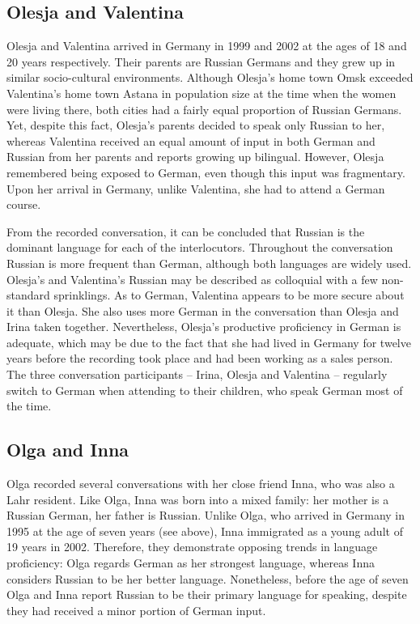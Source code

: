 \subsection{Olesja and Valentina}
Olesja and Valentina arrived in Germany in 1999 and 2002 at the ages of 18 and 20 years respectively. Their parents are Russian Germans and they grew up in similar socio-cultural environments. Although Olesja's home town Omsk exceeded Valentina's home town Astana in population size at the time when the women were living there, both cities had a fairly equal proportion of Russian Germans. Yet, despite this fact, Olesja's parents decided to speak only Russian to her, whereas Valentina received an equal amount of input in both German and Russian from her parents and reports growing up bilingual. However, Olesja remembered being exposed to German, even though this input was fragmentary. Upon her arrival in Germany, unlike Valentina, she had to attend a German course.

From the recorded conversation, it can be concluded that Russian is the dominant language for each of the interlocutors. Throughout the conversation Russian is more frequent than German, although both languages are widely used. Olesja's and Valentina's Russian may be described as colloquial with a few non-standard sprinklings. As to German, Valentina appears to be more secure about it than Olesja. She also uses more German in the conversation than Olesja and Irina taken together. Nevertheless, Olesja's productive proficiency in German is adequate, which may be due to the fact that she had lived in Germany for twelve years before the recording took place and had been working as a sales person. The three conversation participants  --  Irina, Olesja and Valentina  --  regularly switch to German when attending to their children, who speak German most of the time.

\subsection{Olga and Inna}
Olga recorded several conversations with her close friend Inna, who was also a Lahr resident. Like Olga, Inna was born into a mixed family: her mother is a Russian German, her father is Russian. Unlike Olga, who arrived in Germany in 1995 at the age of seven years (see above), Inna immigrated as a young adult of 19 years in 2002. Therefore, they demonstrate opposing trends in language proficiency: Olga regards German as her strongest language, whereas Inna considers  Russian to be her better language. Nonetheless, before the age of seven Olga and Inna report Russian to be their primary language for speaking, despite they had received a minor portion of German input.

